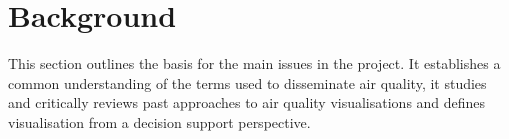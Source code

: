 \chapter{Background}
This section outlines the basis for the main issues in the project. It establishes a common understanding of the terms used to disseminate air quality, it studies and critically reviews  past approaches to air quality visualisations and defines visualisation from a decision support perspective.






